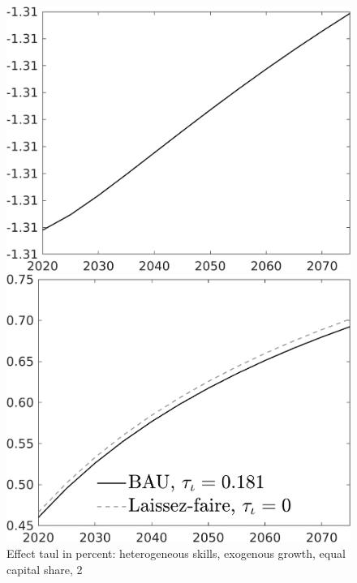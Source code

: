 \documentclass[12pt]{article}
\begin{document}
\begin{figure}[h!!]
	\centering
	\caption{Effect taul in percent: heterogeneous skills, exogenous growth, equal capital share,  2}\label{fig:LF_BAU_nsk0_xgr1_equalcapShare2}
	
	\begin{minipage}[]{0.32\textwidth}
		\includegraphics[width=1\textwidth]{../../codding_model/own_basedOnFried/optimalPol_010922_revision/figures/all_13Sept22/CompTaul_Equlab_LFBAUPer_Reg0_LgLf_spillover0_nsk0_xgr1_knspil0_sep1_countec0_GovRev0_etaa0.79.png}
	\end{minipage}	
	\begin{minipage}[]{0.32\textwidth}
		\includegraphics[width=1\textwidth]{../../codding_model/own_basedOnFried/optimalPol_010922_revision/figures/all_13Sept22/CompTaul_Equlab_LFBAU_Reg0_LgLf_spillover0_nsk0_xgr1_knspil0_sep1_countec0_GovRev0_etaa0.79_lgd1.png}

\end{minipage}
\end{figure}
\end{document}
